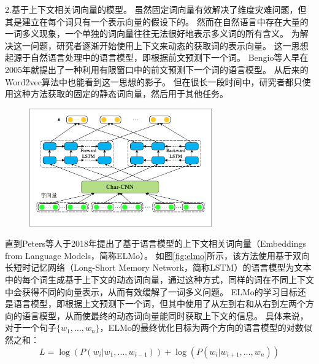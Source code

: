 2.基于上下文相关词向量的模型。
虽然固定词向量有效解决了维度灾难问题，但其是建立在每个词只有一个表示向量的假设下的。
然而在自然语言中存在大量的一词多义现象，一个单独的词向量往往无法很好地表示多义词的所有含义。
为解决这一问题，研究者逐渐开始使用上下文来动态的获取词的表示向量。
这一思想起源于自然语言处理中的语言模型，即根据前文预测下一个词。
Bengio等人早在2005年就提出了一种利用有限窗口中的\cite{bengio-etal-2003-neural}前文预测下一个词的语言模型。
从后来的Word2vec算法中也能看到这一思想的影子。
但在很长一段时间中，研究者都只使用这种方法获取的固定的静态词向量，然后用于其他任务。

\begin{figure}[htbp]
    \centering
    \includegraphics[width=0.7\textwidth]{figures/elmo.pdf}
\end{figure}

直到Peters等人于2018年提出了基于语言模型的上下文相关词向量（Embeddings from Language Models，简称ELMo）\cite{peters-etal-2018-deep}。
如图\ref{fig:elmo}所示，该方法使用基于双向长短时记忆网络（Long-Short Memory Network，简称LSTM）的语言模型为文本中的每个词生成基于上下文的动态词向量，通过这种方式，同样的词在不同上下文中会获得不同的向量表示，从而有效缓解了一词多义问题。
ELMo的学习目标还是语言模型，即根据上文预测下一个词，但其中使用了从左到右和从右到左两个方向的语言模型，从而使最终的动态词向量能同时获取上下文的信息。
具体来说，对于一个句子$\{w_1,\dots,w_n\}$，ELMo的最终优化目标为两个方向的语言模型的对数似然之和：
\begin{equation}
    L= \log(P(w_i|w_1,\dots,w_{i-1})) + \log(P(w_i|w_{i+1},\dots,w_{n}))
\end{equation}

